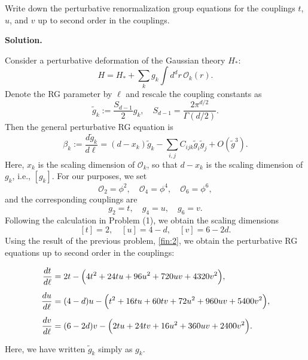 \documentclass[11pt,a4paper]{article}
\newcounter{problem}
\newcounter{saveequation}
\newenvironment{solution}
{
	\par
	\setcounter{saveequation}{\value{equation}}
	\begingroup
	\setcounter{equation}{0}
	\renewcommand{\theequation}{\arabic{problem}.\arabic{equation}}
	\renewcommand{\theHequation}{sol.\arabic{problem}.\arabic{equation}}
	\noindent\textbf{Solution.}\quad
}
{
	\par
	\endgroup
	\setcounter{equation}{\value{saveequation}}
}
\begin{document}
	\begin{problembox}
		Write down the perturbative renormalization group equations for the couplings $t$, $u$, and $v$ up to second order in the couplings.
	\end{problembox}
	\begin{solution}
		Consider a perturbative deformation of the Gaussian theory $H_*$:
		\begin{equation}
			H=H_*+\sum_k g_k\int d^d r\,\mathcal{O}_k(r).
		\end{equation}
		Denote the RG parameter by $\ell$ and rescale the coupling constants as
		\[
		\tilde{g}_k:=\frac{S_{d-1}}{2}g_k,
		\quad
		S_{d-1}=\frac{2\pi^{d/2}}{\Gamma(d/2)}.
		\]
		Then the general perturbative RG equation is
		\begin{equation}
			\beta_k:=\frac{d\tilde{g}_k}{d\ell}
			=(d-x_k)\tilde{g}_k
			-\sum_{i,j}C_{ijk}\tilde{g}_i\tilde{g}_j
			+O(\tilde{g}^3).
		\end{equation}
		Here, $x_k$ is the scaling dimension of $\mathcal{O}_k$, so that
		$d-x_k$ is the scaling dimension of $g_k$, i.e., $[g_k]$.
		For our purposes, we set
		\[
		\mathcal{O}_2=\phi^2,\quad
		\mathcal{O}_4=\phi^4,\quad
		\mathcal{O}_6=\phi^6,
		\]
		and the corresponding couplings are
		\[
		g_2=t,\quad g_4=u,\quad g_6=v.
		\]
		Following the calculation in Problem (1), we obtain the scaling dimensions
		\[
		[t]=2,\quad [u]=4-d,\quad [v]=6-2d.
		\]
		Using the result of the previous problem, \ref{fin:2}, we obtain the
		perturbative RG equations up to second order in the couplings:
		\begin{finalanswer}
			\begin{equation}
				\label{fin:3}
				\begin{aligned}
					\frac{dt}{d\ell}
					={}&
					2t
					-\Bigl(
					4t^2
					+24tu
					+96u^2
					+720uv
					+4320v^2
					\Bigr),
					\\[0.5em]
					\frac{du}{d\ell}
					={}&
					(4-d)u
					-\Bigl(
					t^2
					+16tu
					+60tv
					+72u^2
					+960uv
					+5400v^2
					\Bigr),
					\\[0.5em]
					\frac{dv}{d\ell}
					={}&
					(6-2d)v
					-\Bigl(
					2tu
					+24tv
					+16u^2
					+360uv
					+2400v^2
					\Bigr).
				\end{aligned}
			\end{equation}
		\end{finalanswer}
		Here, we have written $\tilde{g}_k$ simply as $g_k$.
	\end{solution}
\end{document}
